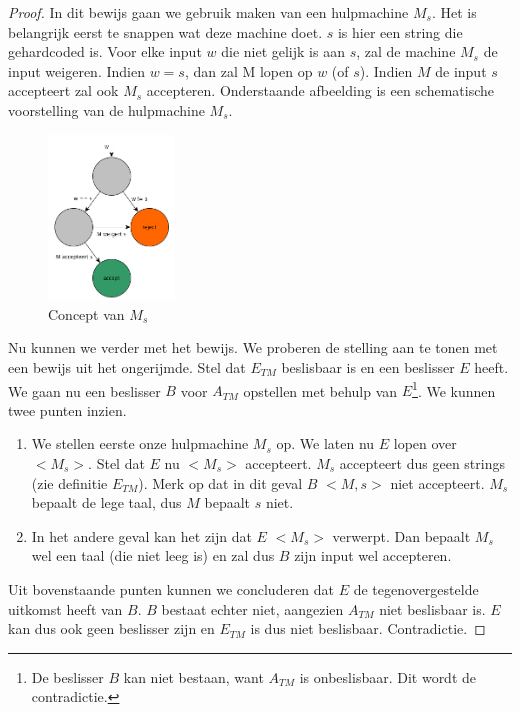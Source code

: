 \begin{proof}
	In dit bewijs gaan we gebruik maken van een hulpmachine $M_s$. Het is belangrijk eerst te snappen wat deze machine doet. $s$ is hier een string die gehardcoded is. Voor elke input $w$ die niet gelijk is aan $s$, zal de machine $M_s$ de input weigeren. Indien $w = s$, dan zal M lopen op $w$ (of $s$). Indien $M$ de input $s$ accepteert zal ook $M_s$ accepteren. Onderstaande afbeelding is een schematische voorstelling van de hulpmachine $M_s$.
	\begin{figure}[H]
  	\centering
    	  \includegraphics[width=0.3\textwidth]{./img/Ms}
  	\caption{Concept van $M_s$}
	\end{figure}
	Nu kunnen we verder met het bewijs. We proberen de stelling aan te tonen met een bewijs uit het ongerijmde. Stel dat $E_{TM}$ beslisbaar is en een beslisser $E$ heeft. We gaan nu een beslisser $B$ voor $A_{TM}$ opstellen met behulp van $E$\footnote{De beslisser $B$ kan niet bestaan, want $A_{TM}$ is onbeslisbaar. Dit wordt de contradictie.}. We kunnen twee punten inzien.
	\begin{enumerate}
		\item We stellen eerste onze hulpmachine $M_s$ op. We laten nu $E$ lopen over $<M_s>$. Stel dat $E$ nu $<M_s>$ accepteert. $M_s$ accepteert dus geen strings (zie definitie $E_{TM}$). Merk op dat in dit geval $B$ $<M,s>$ niet accepteert. $M_s$ bepaalt de lege taal, dus $M$ bepaalt $s$ niet.
		\item In het andere geval kan het zijn dat $E$ $<M_s>$ verwerpt. Dan bepaalt $M_s$ wel een taal (die niet leeg is) en zal dus $B$ zijn input wel accepteren.
	\end{enumerate}
	Uit bovenstaande punten kunnen we concluderen dat $E$ de tegenovergestelde uitkomst heeft van $B$. $B$ bestaat echter niet, aangezien $A_{TM}$ niet beslisbaar is. $E$ kan dus ook geen beslisser zijn en $E_{TM}$ is dus niet beslisbaar. Contradictie.
\end{proof}

